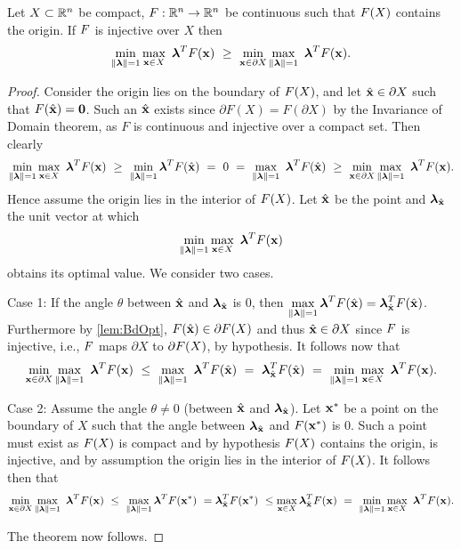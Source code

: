 \begin{thm} 
  \label{thm:MainIneq}
  Let $X\subset\mathbb{R}^n$ be compact, $F:\mathbb{R}^n\rightarrow\mathbb{R}^n$ be continuous such that $F(X)$ contains the origin. 
  If $F$ is injective over $X$ then
  \[
  \min\limits_{\lVert\boldsymbol{\lambda}\rVert=1}\max\limits_{\mathbf{x}\in X}\ \boldsymbol{\lambda}^TF(\mathbf{x}) ~\geq~ \min\limits_{\mathbf{x}\in \partial X} \max\limits_{\lVert\boldsymbol{\lambda}\rVert=1}\ \boldsymbol{\lambda}^TF(\mathbf{x}).
  \]
  \begin{proof}
    Consider the origin lies on the boundary of $F(X)$, and let $\hat{\mathbf{x}} \in \partial X$ such that $F(\hat{\mathbf{x}})=\mathbf{0}$. 
    Such an $\hat{\mathbf{x}}$ exists since $\partial F(X) = F(\partial X)$ by the Invariance of Domain theorem, as $F$ is continuous and injective over a compact set. 
    Then  clearly
    \[
    \min\limits_{\norm{\vlambda}=1}\max\limits_{\vx\in X}\ \vlambda^T\vF(\vx) ~\geq~
    \min\limits_{\norm{\vlambda}=1}\vlambda^T\vF(\hat{\vx}) ~=~ 0 ~=~
    \max\limits_{\norm{\vlambda}=1}\ \vlambda^T\vF(\hat{\vx}) ~\geq~
    \min\limits_{\vx\in \partial X}\max\limits_{\norm{\vlambda}=1}\ \vlambda^T\vF(\vx).
\]
Hence assume the origin lies in the interior of $F(X)$.
Let $\hat{\mathbf{x}}$ be the point and $\boldsymbol{\lambda}_{\hat{\mathbf{x}}}$ the unit vector at which
\[
\min\limits_{\lVert\boldsymbol{\lambda}\rVert=1}\max\limits_{\mathbf{x}\in X}\ \boldsymbol{\lambda}^TF(\mathbf{x})
\]
obtains its optimal value.
We consider two cases.

Case 1: If the angle $\theta$ between $\hat{\mathbf{x}}$ and $\boldsymbol{\lambda}_{\hat{\mathbf{x}}}$ is $0$, then $\displaystyle \max\limits_{\lVert\boldsymbol{\lambda}\rVert=1}\boldsymbol{\lambda}^TF(\hat{\mathbf{x}}) = \boldsymbol{\lambda}_{\hat{\mathbf{x}}}^TF(\hat{\mathbf{x}})$. 
Furthermore by \cref{lem:BdOpt}, $F(\hat{\mathbf{x}}) \in \partial F(X)$ and thus $\hat{\mathbf{x}}\in \partial X$ since $F$ is injective, i.e., $F$ maps $\partial X$ to $\partial F(X)$, by hypothesis. 
It follows now that
\[
\min\limits_{\vx\in \partial X}\max\limits_{\norm{\vlambda}=1}\ \vlambda^T\vF(\vx) ~\leq~
\max\limits_{\norm{\vlambda}=1}\ \vlambda^T\vF(\hat{\vx}) ~=~
\vlambda_{\hat{\vx}}^T\vF(\hat{\vx}) ~=~
\min\limits_{\norm{\vlambda}=1}\max\limits_{\vx\in X}\ \vlambda^T\vF(\vx).
\]

Case 2: Assume the angle $\theta \neq 0$ (between $\hat{\mathbf{x}}$ and $\boldsymbol{\lambda}_{\hat{\mathbf{x}}}$). 
Let $\mathbf{x}^*$ be a point on the boundary of $X$ such that the angle between $\boldsymbol{\lambda}_{\hat{\mathbf{x}}}$ and $F(\mathbf{x}^*)$ is 0. 
Such a point must exist as $F(X)$ is compact and by hypothesis $F(X)$ contains the origin, is injective,
and by assumption the origin lies in the interior of $F(X)$. 
It follows then that
\[
\min\limits_{\vx\in \partial X}\max\limits_{\norm{\vlambda}=1}\ \vlambda^T\vF(\vx) ~\leq~
\max\limits_{\norm{\vlambda}=1}\vlambda^T \vF(\vx^*) ~=
\vlambda_{\hat{\vx}}^T\vF(\vx^*) ~\leq
\max\limits_{\vx\in X}\vlambda_{\hat{\vx}}^T\vF(\vx) ~=~
\min\limits_{\norm{\vlambda}=1}\max\limits_{\vx\in X}\ \vlambda^T\vF(\vx).
\]

The theorem now follows.
\end{proof}
\end{thm}

